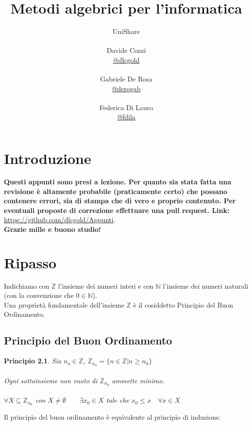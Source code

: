\documentclass[a4paper,12pt, oneside]{book}
\title{Metodi algebrici per l'informatica}
\author{UniShare\\\\Davide Cozzi\\\href{https://t.me/dlcgold}{@dlcgold}\\\\Gabriele De Rosa\\\href{https://t.me/derogab}{@derogab} \\\\Federica Di Lauro\\\href{https://t.me/f_dila}{@f\textunderscore dila}}
\date{}
\begin{document}
\maketitle


\newtheorem{teorema}{Teorema}
\newtheorem{definizione}{Definizione}
\newtheorem{principio}{Principio}
\newtheorem{esempio}{Esempio}
\newtheorem{corollario}{Corollario}
\newtheorem{lemma}{Lemma}
\newtheorem{osservazione}{Osservazione}
\newtheorem{nota}{Nota}
\newtheorem{algoritmo}{Algoritmo}
\tableofcontents
\renewcommand{\chaptermark}[1]{%
	\markboth{\chaptername
		\ \thechapter.\ #1}{}}
\renewcommand{\sectionmark}[1]{\markright{\thesection.\ #1}}

\chapter{Introduzione}
\textbf{Questi appunti sono presi a lezione. Per quanto sia stata fatta una revisione è altamente probabile (praticamente certo) che possano contenere errori, sia di stampa che di vero e proprio contenuto. Per eventuali proposte di correzione effettuare una pull request. Link: } \url{https://github.com/dlcgold/Appunti}.\\
\textbf{Grazie mille e buono studio!}

\chapter{Ripasso}
Indichiamo con $\mathbb{Z}$ l'insieme dei numeri interi e con $\mathbb{N}$ l'insieme dei numeri naturali (con la convenzione che $0 \in \mathbb{N}$).\\
Una proprietà fondamentale dell'insieme $\mathbb{Z}$ è il cosiddetto Principio del Buon Ordinamento.
\section{Principio del Buon Ordinamento}
\begin{principio}

	Sia $n_o \in \mathbb{Z}$, $\mathbb{Z}_{n_o} = \{n \in \mathbb{Z} | n \geq n_0\}$ \\\\
	Ogni sottoinsieme non vuoto di $\mathbb{Z}_{n_0}$ ammette minimo. \\\\
	$\forall X \subseteq \mathbb{Z}_{n_0}$ con $X \not = \emptyset \qquad \exists x_0 \in X$ tale che $x_0 \leq x \quad \forall x \in X$\\

\end{principio}
Il principio del buon ordinamento è equivalente al principio di induzione.
\end{document}
